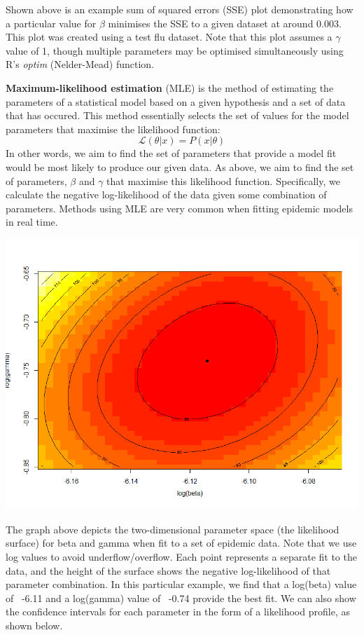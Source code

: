 \documentclass[11pt, a4paper, oneside,titlepage]{article}
\begin{document}
\begin{framed}
Shown above is an example sum of squared errors (SSE) plot demonstrating how a particular value for $\beta$ minimises the SSE to a given dataset at around 0.003. This plot was created using a test flu dataset. Note that this plot assumes a $\gamma$ value of 1, though multiple parameters may be optimised simultaneously using R's \emph{optim} (Nelder-Mead) function.

{\bf Maximum-likelihood estimation} (MLE) is the method of estimating the parameters of a statistical model based on a given hypothesis and a set of data that has occured. This method essentially selects the set of values for the model parameters that maximise the likelihood function:
\begin{equation*}
	\mathcal{L} (\theta | x) = P(x | \theta)
\end{equation*}
In other words, we aim to find the set of parameters that  provide a model fit would be most likely to produce our given data. As above, we aim to find the set of parameters, $\beta$ and $\gamma$ that maximise this likelihood function. Specifically, we calculate the negative log-likelihood of the data given some combination of parameters. Methods using MLE are very common when fitting epidemic models in real time.\cite{white, hall, nishiura}
{\begin{center} \includegraphics[width=140mm]{logmle.png}\end{center}}
The graph above depicts the two-dimensional parameter space (the likelihood surface) for beta and gamma when fit to a set of epidemic data. Note that we use log values to avoid underflow/overflow.  Each point represents a separate fit to the data, and the height of the surface shows the negative log-likelihood of that parameter combination. In this particular example, we find that a log(beta) value of ~-6.11 and a log(gamma) value of ~-0.74 provide the best fit. We can also show the confidence intervals for each parameter in the form of a likelihood profile, as shown below.


\end{framed}
\end{document}
